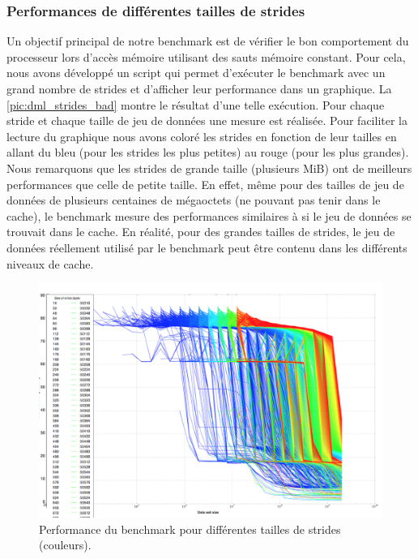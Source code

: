     
    \subsubsection{Performances de différentes tailles de strides}
        
        Un objectif principal de notre benchmark est de vérifier le bon comportement du processeur lors d'accès mémoire utilisant des sauts mémoire constant. Pour cela, nous avons développé un script qui permet d'exécuter le benchmark avec un grand nombre de strides et d'afficher leur performance dans un graphique. La \autoref{pic:dml_strides_bad} montre le résultat d'une telle exécution. Pour chaque stride et chaque taille de jeu de données une mesure est réalisée. Pour faciliter la lecture du graphique nous avons coloré les strides en fonction de leur tailles en allant du bleu (pour les strides les plus petites) au rouge (pour les plus grandes). Nous remarquons que les strides de grande taille (plusieurs MiB) ont de meilleurs performances que celle de petite taille. En effet, même pour des tailles de jeu de données de plusieurs centaines de mégaoctets (ne pouvant pas tenir dans le cache), le benchmark mesure des performances similaires à si le jeu de données se trouvait dans le cache. En réalité, pour des grandes tailles de strides, le jeu de données réellement utilisé par le benchmark peut être contenu dans les différents niveaux de cache. 
      
        \begin{figure}
        \center
        \includegraphics[width=12cm]{images/dml_strides_bad.png}
        \caption{\label{pic:dml_strides_bad} Performance du benchmark pour différentes tailles de strides (couleurs).  }
        \end{figure}
        
